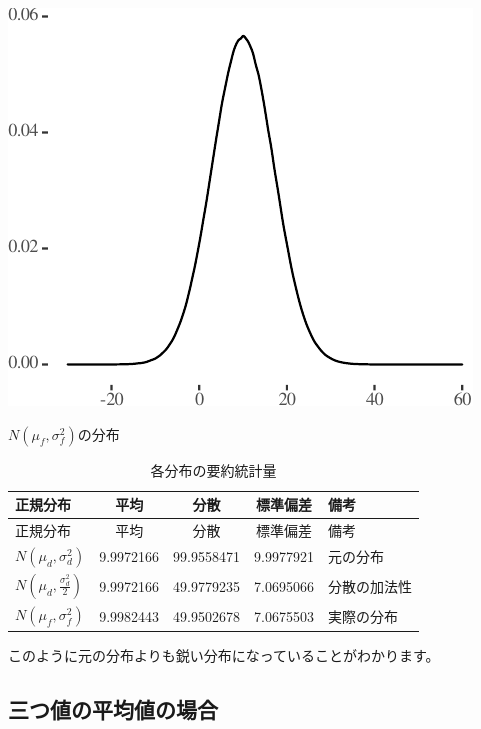 \documentclass[]{tufte-handout}
\begin{document}
\begin{marginfigure}

{\centering \includegraphics{AdditivityOfVariance_files/figure-latex/unnamed-chunk-12-1} 

}

\caption[$N(\mu_f, \sigma^2_f)$の分布]{$N(\mu_f, \sigma^2_f)$の分布}\label{fig:unnamed-chunk-12}
\end{marginfigure}

\begin{longtable}[]{@{}lcccl@{}}
\caption{各分布の要約統計量}\tabularnewline
\toprule
正規分布 & 平均 & 分散 & 標準偏差 & 備考 \\
\midrule
\endfirsthead
\toprule
正規分布 & 平均 & 分散 & 標準偏差 & 備考 \\
\midrule
\endhead
\(N(\mu_d, \sigma^2_d)\) & 9.9972166 & 99.9558471 & 9.9977921 &
元の分布 \\
\(N(\mu_d, \frac{\sigma^2_d}{2})\) & 9.9972166 & 49.9779235 & 7.0695066
& 分散の加法性 \\
\(N(\mu_f, \sigma^2_f)\) & 9.9982443 & 49.9502678 & 7.0675503 &
実際の分布 \\
\bottomrule
\end{longtable}

このように元の分布よりも鋭い分布になっていることがわかります。

\newpage

\hypertarget{ux4e09ux3064ux5024ux306eux5e73ux5747ux5024ux306eux5834ux5408}{%
\subsection{\texorpdfstring{\textbf{三つ値の平均値の場合}}{三つ値の平均値の場合}}\label{ux4e09ux3064ux5024ux306eux5e73ux5747ux5024ux306eux5834ux5408}}
\end{document}
